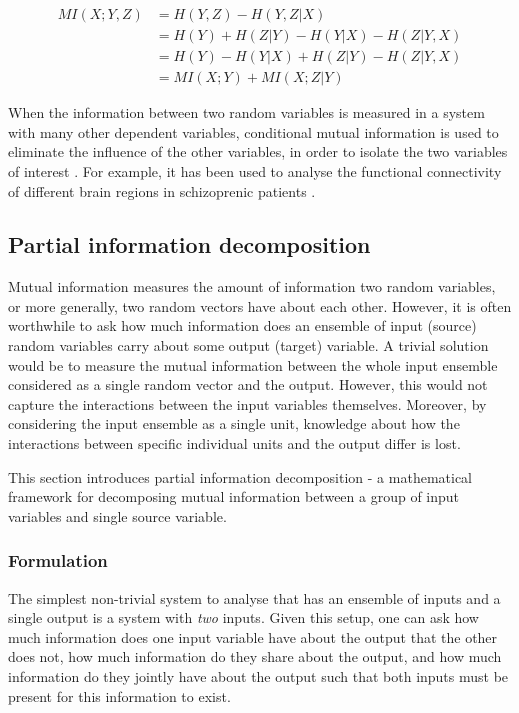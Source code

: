 \documentclass[12pt]{article}
\begin{document}
\begin{align}
MI(X;Y,Z) & = H(Y,Z) - H(Y,Z|X) \nonumber \\ 
		  & = H(Y) + H(Z|Y) - H(Y|X) - H(Z|Y,X) \nonumber \\ 
		  & = H(Y) - H(Y|X) + H(Z|Y) - H(Z|Y,X) \nonumber \\ 
		  & = MI(X;Y) + MI(X;Z|Y)
\label{eq:chain-rule-inf}
\end{align}

When the information between two random variables is measured in a system with many other dependent variables, conditional mutual information is used to eliminate the influence of the other variables, in order to isolate the two variables of interest \cite{williams-beer}. For example, it has been used to analyse the functional connectivity of different brain regions in schizoprenic patients \cite{brain-cond-inf}.

\subsection{Partial information decomposition}

Mutual information measures the amount of information two random variables, or more generally, two random vectors have about each other. However, it is often worthwhile to ask how much information does an ensemble of input (source) random variables carry about some output (target) variable. A trivial solution would be to measure the mutual information between the whole input ensemble considered as a single random vector and the output. However, this would not capture the interactions between the input variables themselves. Moreover, by considering the input ensemble as a single unit, knowledge about how the interactions between specific individual units and the output differ is lost. 

This section introduces partial information decomposition - a mathematical framework for decomposing mutual information between a group of input variables and single source variable.   

\subsubsection{Formulation}

The simplest non-trivial system to analyse that has an ensemble of inputs and a single output is a system with \textit{two} inputs. Given this setup, one can ask how much information does one input variable have about the output that the other does not, how much information do they share about the output, and how much information do they jointly have about the output such that both inputs must be present for this information to exist.
\end{document}
